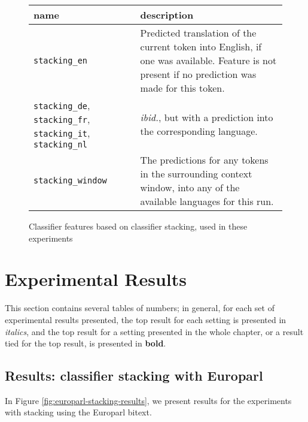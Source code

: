 \begin{figure*}
  \begin{centering}
  \begin{tabular}{|p{3.5cm}|p{11cm}|}
    \hline
    name          & description  \\
    \hline
    \texttt{stacking\_en} & Predicted translation of the current token into
    English, if one was available. Feature is not present if no prediction was
    made for this token. \\
    \hline
    \texttt{stacking\_de}, \texttt{stacking\_fr}, \texttt{stacking\_it},
    \texttt{stacking\_nl} & \emph{ibid.}, but with a prediction into the
    corresponding language.\\
    \hline
    \texttt{stacking\_window} & The predictions for any tokens in the
    surrounding context window, into any of the available languages for this
    run. \\
    \hline
  \end{tabular}
  \end{centering}
  \caption{Classifier features based on classifier stacking, used in these
  experiments}
  \label{fig:stackingfeatures}
\end{figure*}

\section{Experimental Results}
\label{sec:multilingual-results}

This section contains several tables of numbers; in general, for each set of
experimental results presented, the top result for each setting is presented in
\emph{italics}, and the top result for a setting presented in the whole
chapter, or a result tied for the top result, is presented in \textbf{bold}.

\subsection{Results: classifier stacking with Europarl}

In Figure \ref{fig:europarl-stacking-results}, we present results for the
experiments with stacking using the Europarl bitext.

